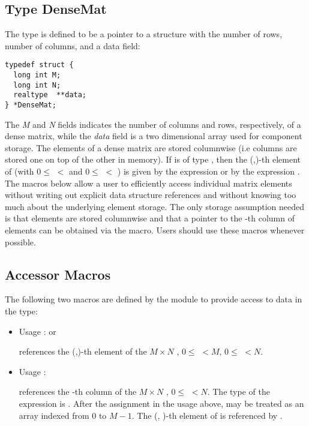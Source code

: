 \subsection{Type DenseMat}
The type  is defined to be a pointer to a structure    
with the number of rows, number of columns, and a data field:
\begin{verbatim}
typedef struct {
  long int M;
  long int N;
  realtype  **data;
} *DenseMat;
\end{verbatim}
The {\em M} and {\em N} fields indicates the number of columns and rows,
respectively, of a dense matrix, while the {\em data} field is a two 
dimensional array used for component storage.
The elements of a dense matrix are stored columnwise (i.e columns are stored 
one on top of the other in memory). If  is of type , 
then the (,)-th element of  
(with $0 \le$  $<$  and $ 0 \le$  $<$ ) 
is given by the expression  
or by the expression . The macros below     
allow a user to efficiently access individual matrix           
elements without writing out explicit data structure           
references and without knowing too much about the underlying   
element storage. The only storage assumption needed is that    
elements are stored columnwise and that a pointer to the -th   
column of elements can be obtained via the  macro.    
Users should use these macros whenever possible.               

\subsection{Accessor Macros}
The following two macros are defined by the {\dense} module to provide
access to data in the  type:
\begin{itemize}
\item {}
  \par Usage :  or
  \par {} references the (,)-th element of the $M \times N$
   , $0 \le$  $< M$, $0 \le$  $< N$.
  
\item {}
  \par Usage : 
  \par {} references the -th column of the $M \times N$
   , $0 \le$  $< N$. The type of the expression          
   is  . After the assignment in the usage    
  above,  may be treated as an array indexed from $0$ to $M-1$. 
  The (, )-th element of  is referenced by .  
\end{itemize}

